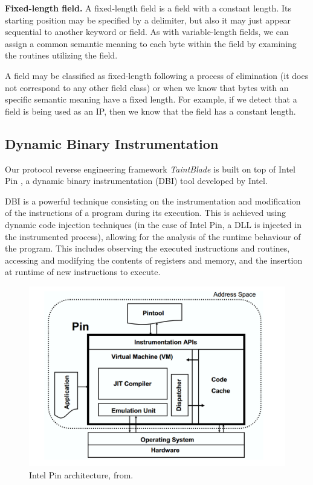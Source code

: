 \documentclass[conference]{IEEEtran}
\begin{document}
\textbf{Fixed-length field.} A fixed-length field is a field with a constant length. Its starting
position may be specified by a delimiter, but also it may just appear sequential to another keyword
or field.
As with variable-length fields, we can assign a common semantic meaning to each byte within the field by
examining the routines utilizing the field.

A field may be classified as fixed-length following a process of elimination
(it does not correspond to any other field class) or when we know that bytes
with an specific semantic meaning have a fixed length. For example, if we
detect that a field is being used as an IP, then we know that the field has a
constant length.

\subsection {Dynamic Binary Instrumentation}
Our protocol reverse engineering framework \textit{TaintBlade} is built on top
of Intel Pin \cite{intelpin_main}, a dynamic binary instrumentation (DBI) tool
developed by Intel.

DBI is a powerful technique consisting on the instrumentation and modification
of the instructions of a program during its execution. This is achieved using
dynamic code injection techniques (in the case of Intel Pin, a DLL is injected
in the instrumented process), allowing for the analysis of the runtime
behaviour of the program. This includes observing the executed instructions and
routines, accessing and modifying the contents of registers and memory, and the
insertion at runtime of new instructions to execute.

\begin{figure}[htbp]
    \centerline{\includegraphics[width=1.0\columnwidth]{images/intelpin_arch.png}}
    \caption{Intel Pin architecture, from\cite{intelpin_lukpaper}.}
    \label{figure:intelpin_arch}
\end{figure}
\end{document}
